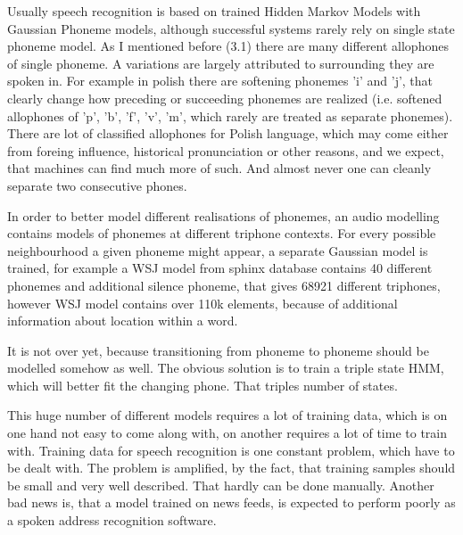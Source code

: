 \documentclass[12pt,a4paper,english]{article}
\begin{document}
Usually speech recognition is based on trained Hidden Markov Models with Gaussian Phoneme models, although successful systems rarely rely on single state phoneme model. \newline
As I mentioned before (3.1) there are many different allophones of single phoneme. A variations are largely attributed to surrounding they are spoken in. For example in polish there are softening phonemes 'i' and 'j', that clearly change how preceding or succeeding phonemes are realized (i.e. softened allophones of 'p', 'b', 'f', 'v', 'm', which rarely are treated as separate phonemes). There are lot of classified allophones for Polish language, which may come either from foreing influence, historical pronunciation or other reasons, and we expect, that machines can find much more of such. \newline
And almost never one can cleanly separate two consecutive phones. \newline

 In order to better model different realisations of phonemes, an audio modelling contains models of phonemes at different triphone contexts. 
For every possible neighbourhood a given phoneme might appear, a separate Gaussian model is trained, for example a WSJ model from sphinx database contains 40 different phonemes and additional silence phoneme, that gives 68921 different triphones, however WSJ model contains over 110k elements,  because of additional information about location within a word. \newline

It is not over yet, because transitioning from phoneme to phoneme should be modelled somehow as well. The obvious solution is to train a triple state HMM, which will better fit the changing phone. That triples number of states. \newline

This huge number of different models requires a lot of training data, which is on one hand not easy to come along with, on another requires a lot of time to train with. \newline
Training data for speech recognition is one constant problem, which have to be dealt with. The problem is amplified, by the fact, that training samples should be small and very well described. That hardly can be done manually. \newline
Another bad news is, that a model trained on news feeds, is expected to perform poorly as a spoken address recognition software. \newline
\end{document}
